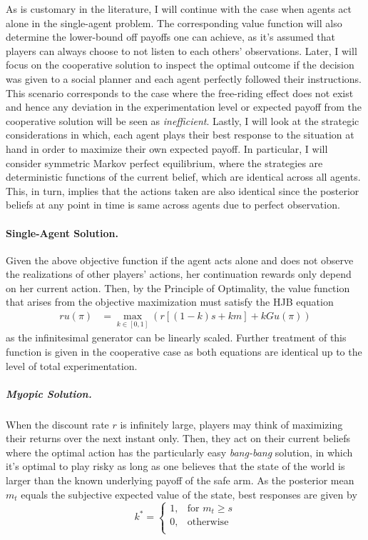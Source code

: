 As is customary in the literature, I will continue with the case when agents act alone in the single-agent problem. The corresponding value function will also determine the lower-bound off payoffs one can achieve, as it's assumed that players can always choose to not listen to each others' observations. Later, I will focus on the cooperative solution to inspect the optimal outcome if the decision was given to a social planner and each agent perfectly followed their instructions.  This scenario corresponds to the case where the free-riding effect does not exist and hence any deviation in the experimentation level or expected payoff from the cooperative solution will be seen as \textit{inefficient}. Lastly, I will look at the strategic considerations in which, each agent plays their best response to the situation at hand in order to maximize their own expected payoff. In particular, I will consider symmetric Markov perfect equilibrium, where the strategies are deterministic functions of the current belief, which are identical across all agents. This, in turn, implies that the actions taken are also identical since the posterior beliefs at any point in time is same across agents due to perfect observation.

\paragraph{Single-Agent Solution.} Given the above objective function if the agent acts alone and does not observe the realizations of other players' actions, her continuation rewards only depend on her current action. Then, by the Principle of Optimality, the value function that arises from the objective maximization must satisfy the HJB equation
\begin{align*}
 r u(\pi) &= \max_{k \in [0,1]} \left( r[(1-k)s + k m ] + k{G}u(\pi) \right) 
\end{align*}
as the infinitesimal generator can be linearly scaled. Further treatment of this function is given in the cooperative case as both equations are identical up to the level of total experimentation.

\subparagraph{Myopic Solution.}  When the discount rate $r$ is infinitely large, players may think of maximizing their returns over the next instant only. Then, they act on their current beliefs where the optimal action has the particularly easy \textit{bang-bang} solution, in which it's optimal to play risky as long as one believes that the state of the world is larger than the known underlying payoff of the safe arm. As the posterior mean $m_t$ equals the subjective expected value of the state, best responses are given by
\[
  k^* =
  \begin{cases}
    1, & \text{for } m_t \geq s \\
    0, & \text{otherwise }  \\
  \end{cases}
\]

